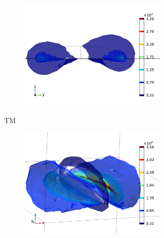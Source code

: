 \begin{figure}
\begin{subfigure}{0.5\textwidth}
    \begin{subfigure}{\textwidth}
        \centering
        \includegraphics[width=0.9\linewidth]{figures/ch4/S5B/fielddistr/s5b_normE_TM_wl1010_phi90(1).png}
    \end{subfigure}
    \caption{TM}
    \end{subfigure}
    \begin{subfigure}{0.5\textwidth}
    \begin{subfigure}{\textwidth}
        \centering
        \includegraphics[width=0.9\linewidth]{figures/ch4/S5B/fielddistr/s5b_normE_TE_wl1010_phi90.png}
    \end{subfigure}
    

\end{subfigure}
\end{figure}
